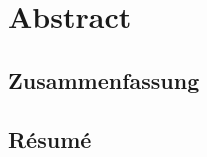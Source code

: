 

\cleardoublepage
\chapter*{Abstract}




\begin{otherlanguage}{german}
\cleardoublepage
\chapter*{Zusammenfassung}

\end{otherlanguage}




\begin{otherlanguage}{french}
\cleardoublepage
\chapter*{Résumé}

\end{otherlanguage}


